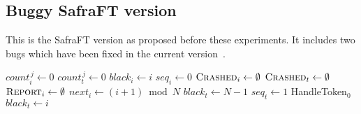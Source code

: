 \begin{appendices}
\section{Buggy SafraFT version}
\label{sec:oldSafra}
This is the SafraFT version as proposed before these experiments.
It includes two bugs which have been fixed in the current version~\cite{safraFT2018}.

\begin{algorithm}[ht]
	\caption{$\mbox{\rm Initialization}_{\,i\,}$~}
	{
		$\textit{count}_i^{\,j} \leftarrow 0$\;
		$\textit{count}_t^{\,j} \leftarrow 0$\;
	}
	$\textit{black}_i \leftarrow i$\;
	$\textit{seq}_i \leftarrow 0$\;
	$\textit{\sc Crashed}_i\leftarrow\emptyset$\;
	$\textit{\sc Crashed}_t\leftarrow\emptyset$\;
	$\textit{\sc Report}_i\leftarrow\emptyset$\;
	$\textit{next}_i \leftarrow (i+1) \bmod N$\;
	{
		$\textit{black}_t \leftarrow N-1$\;
		$\textit{seq}_t \leftarrow 1$\;
		HandleToken$_0$\;
	}
	{$\textit{black}_t \leftarrow i$\;}
\end{algorithm}

\begin{algorithm}[ht]
	\caption{$\mbox{\rm SendBasicMessage}_{\,i\,}(m,j)$~}
\end{algorithm}\vspace{.5cm}


\end{appendices}
